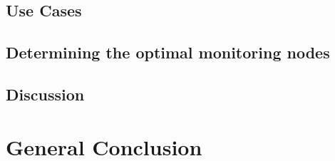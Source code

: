 \newpage
\subsection{Use Cases}


\subsection{Determining the optimal monitoring nodes}


\subsection{Discussion}


\section{General Conclusion}
